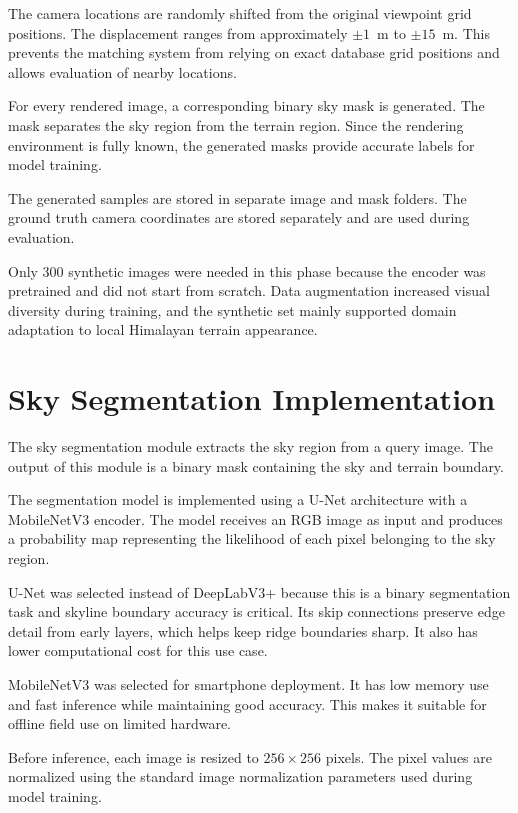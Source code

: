 The camera locations are randomly shifted from the original viewpoint grid positions. The displacement ranges from approximately $\pm1$~m to $\pm15$~m. This prevents the matching system from relying on exact database grid positions and allows evaluation of nearby locations.

For every rendered image, a corresponding binary sky mask is generated. The mask separates the sky region from the terrain region. Since the rendering environment is fully known, the generated masks provide accurate labels for model training.

The generated samples are stored in separate image and mask folders. The ground truth camera coordinates are stored separately and are used during evaluation.

Only 300 synthetic images were needed in this phase because the encoder was pretrained and did not start from scratch. Data augmentation increased visual diversity during training, and the synthetic set mainly supported domain adaptation to local Himalayan terrain appearance.

\section{Sky Segmentation Implementation}

The sky segmentation module extracts the sky region from a query image. The output of this module is a binary mask containing the sky and terrain boundary.

The segmentation model is implemented using a U-Net architecture with a MobileNetV3 encoder. The model receives an RGB image as input and produces a probability map representing the likelihood of each pixel belonging to the sky region.

U-Net was selected instead of DeepLabV3+ because this is a binary segmentation task and skyline boundary accuracy is critical. Its skip connections preserve edge detail from early layers, which helps keep ridge boundaries sharp. It also has lower computational cost for this use case.

MobileNetV3 was selected for smartphone deployment. It has low memory use and fast inference while maintaining good accuracy. This makes it suitable for offline field use on limited hardware.

Before inference, each image is resized to $256 \times 256$ pixels. The pixel values are normalized using the standard image normalization parameters used during model training.

